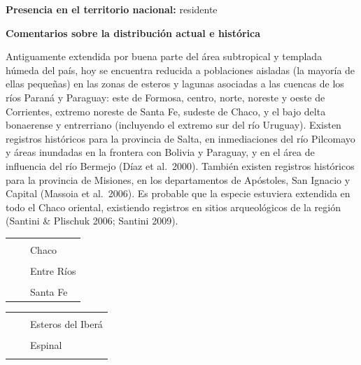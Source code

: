 \documentclass[
  x11names]{article}
\begin{document}
\textbf{Presencia en el territorio nacional:} residente

\textbf{Comentarios sobre la distribución actual e histórica}

Antiguamente extendida por buena parte del área subtropical y templada
húmeda del país, hoy se encuentra reducida a poblaciones aisladas (la
mayoría de ellas pequeñas) en las zonas de esteros y lagunas asociadas a
las cuencas de los ríos Paraná y Paraguay: este de Formosa, centro,
norte, noreste y oeste de Corrientes, extremo noreste de Santa Fe,
sudeste de Chaco, y el bajo delta bonaerense y entrerriano (incluyendo
el extremo sur del río Uruguay). Existen registros históricos para la
provincia de Salta, en inmediaciones del río Pilcomayo y áreas inundadas
en la frontera con Bolivia y Paraguay, y en el área de influencia del
río Bermejo (Díaz et al.~2000). También existen registros históricos
para la provincia de Misiones, en los departamentos de Apóstoles, San
Ignacio y Capital (Massoia et al.~2006). Es probable que la especie
estuviera extendida en todo el Chaco oriental, existiendo registros en
sitios arqueológicos de la región (Santini \& Plischuk 2006; Santini
2009).

\begin{tabu} to 
\toprule
\textbf{} &  & \\
\textbf{} &  & Chaco\\
\textbf{} &  & \\
\textbf{} &  & Entre Ríos\\
\textbf{} &  & \\
\textbf{} &  & Santa Fe\\
\bottomrule
\end{tabu}

\begin{tabu} to 
\toprule
\textbf{} &  & \\
\textbf{} &  & Esteros del Iberá\\
\textbf{} &  & \\
\textbf{} &  & Espinal\\
\textbf{} &  & \\
\bottomrule
\end{tabu}
\end{document}
